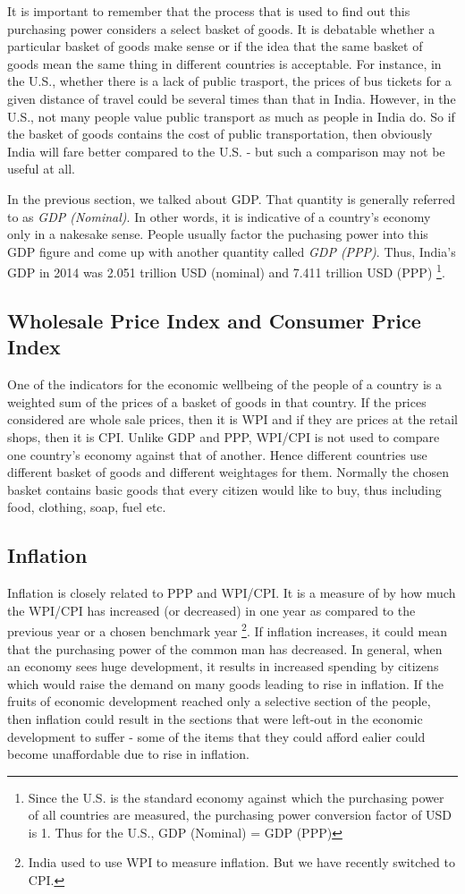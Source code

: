 It is important to remember that the process that is used to find out this purchasing power considers a select basket of goods. It is debatable whether a particular basket of goods make sense or if the idea that the same basket of goods mean the same thing in different countries is acceptable. For instance, in the U.S., whether there is a lack of public trasport, the prices of bus tickets for a given distance of travel could be several times than that in India. However, in the U.S., not many people value public transport as much as people in India do. So if the basket of goods contains the cost of public transportation, then obviously India will fare better compared to the U.S. - but such a comparison may not be useful at all.

In the previous section, we talked about GDP. That quantity is generally referred to as \emph{GDP (Nominal)}. In other words, it is indicative of a country's economy only in a nakesake sense. People usually factor the puchasing power into this GDP figure and come up with another quantity called \emph{GDP (PPP)}. Thus, India's GDP in 2014 was 2.051 trillion USD (nominal) and 7.411 trillion USD (PPP) \footnote{Since the U.S. is the standard economy against which the purchasing power of all countries are measured, the purchasing power conversion factor of USD is 1. Thus for the U.S., GDP (Nominal) = GDP (PPP)}.

\subsection{Wholesale Price Index and Consumer Price Index}
One of the indicators for the economic wellbeing of the people of a country is a weighted sum of the prices of a basket of goods in that country. If the prices considered are whole sale prices, then it is WPI and if they are prices at the retail shops, then it is CPI. Unlike GDP and PPP, WPI/CPI is not used to compare one country's economy against that of another. Hence different countries use different basket of goods and different weightages for them. Normally the chosen basket contains basic goods that every citizen would like to buy, thus including food, clothing, soap, fuel etc. 

\subsection{Inflation}
Inflation is closely related to PPP and WPI/CPI. It is a measure of by how much the WPI/CPI has increased (or decreased)  in one year as compared to the previous year or a chosen benchmark year \footnote{India used to use WPI to measure inflation. But we have recently switched to CPI.}. If inflation increases, it could mean that the  purchasing power of the common man has decreased. In general, when an economy sees huge development, it results in increased spending by citizens which would raise the demand on many goods leading to rise in inflation. If the fruits of economic development reached only a selective section of the people, then inflation could result in the sections that were left-out in the economic development to suffer - some of the items that they could afford ealier could become unaffordable due to rise in inflation. 

